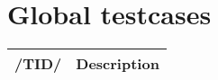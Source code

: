 \chapter{Global testcases}
\begin{tabular}{|l | l|}
   \hline
  /TID/ & Description \\
   \hline
\end{tabular}
